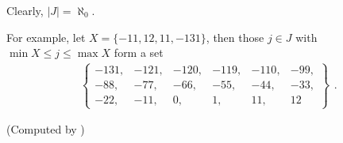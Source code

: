 Clearly, $|J| = \aleph_0$.

For example, let $X = \{ -11,12,11, -131 \}$, then those $j \in J$ with $\min X \le j \le \max X$ form a set
$$
\begin{aligned}
\left\{
\begin{matrix}
-131, & -121, & -120, & -119, & -110, & -99, \\
-88, & -77, & -66, & -55, & -44, & -33, \\
-22, & -11, & 0, & 1, & 11, & 12
\end{matrix}
\right\}	
\end{aligned}.
$$

(Computed by )
















%
